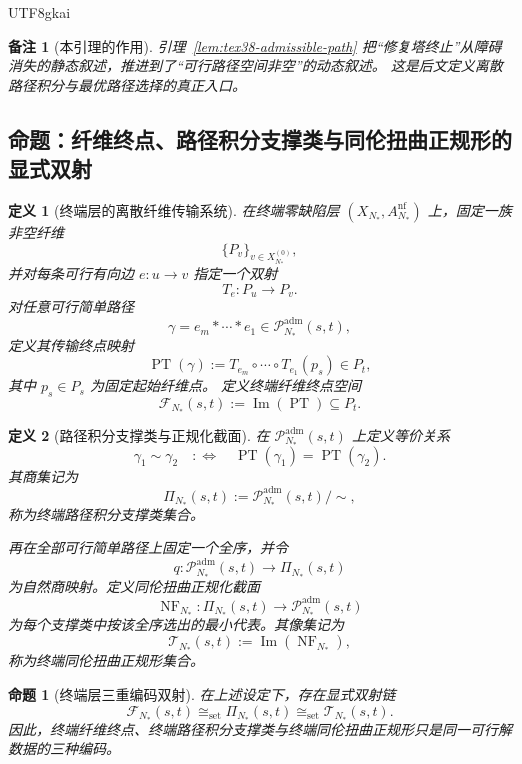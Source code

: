 \documentclass[12pt]{article}
\newtheorem{definition}{定义}[section]
\newtheorem{proposition}{命题}[section]
\newtheorem{remark}{备注}[section]
\newcommand{\NF}{\operatorname{NF}}
\newcommand{\PT}{\operatorname{PT}}
\begin{document}
\begin{CJK*}{UTF8}{gkai}
\begin{remark}[本引理的作用]
引理~\ref{lem:tex38-admissible-path} 把“修复塔终止”从障碍消失的静态叙述，推进到了“可行路径空间非空”的动态叙述。
这是后文定义离散路径积分与最优路径选择的真正入口。
\end{remark}

\subsection{命题：纤维终点、路径积分支撑类与同伦扭曲正规形的显式双射}
\label{sec:tex38-bijection}

\begin{definition}[终端层的离散纤维传输系统]
在终端零缺陷层 $(X_{N_\ast},A_{N_\ast}^{\mathrm{nf}})$ 上，固定一族非空纤维
\[
  \{P_v\}_{v\in X_{N_\ast}^{(0)}},
\]
并对每条可行有向边 $e:u\to v$ 指定一个双射
\[
  T_e:P_u\to P_v.
\]
对任意可行简单路径
\[
  \gamma=e_m*\cdots*e_1\in \mathcal{P}^{\mathrm{adm}}_{N_\ast}(s,t),
\]
定义其传输终点映射
\[
  \PT(\gamma):=T_{e_m}\circ\cdots\circ T_{e_1}(p_s)\in P_t,
\]
其中 $p_s\in P_s$ 为固定起始纤维点。
定义终端纤维终点空间
\[
  \mathcal{F}_{N_\ast}(s,t):=\operatorname{Im}(\PT)\subseteq P_t.
\]
\end{definition}

\begin{definition}[路径积分支撑类与正规化截面]
在 $\mathcal{P}^{\mathrm{adm}}_{N_\ast}(s,t)$ 上定义等价关系
\[
  \gamma_1\sim \gamma_2
  \quad:\Longleftrightarrow\quad
  \PT(\gamma_1)=\PT(\gamma_2).
\]
其商集记为
\[
  \Pi_{N_\ast}(s,t):=
  \mathcal{P}^{\mathrm{adm}}_{N_\ast}(s,t)\big/\sim,
\]
称为\emph{终端路径积分支撑类集合}。

再在全部可行简单路径上固定一个全序，并令
\[
  q:\mathcal{P}^{\mathrm{adm}}_{N_\ast}(s,t)\to \Pi_{N_\ast}(s,t)
\]
为自然商映射。定义\emph{同伦扭曲正规化截面}
\[
  \NF_{N_\ast}:\Pi_{N_\ast}(s,t)\to \mathcal{P}^{\mathrm{adm}}_{N_\ast}(s,t)
\]
为每个支撑类中按该全序选出的最小代表。其像集记为
\[
  \mathcal{T}_{N_\ast}(s,t):=\operatorname{Im}(\NF_{N_\ast}),
\]
称为\emph{终端同伦扭曲正规形集合}。
\end{definition}

\begin{proposition}[终端层三重编码双射]
\label{prop:tex38-bijection}
在上述设定下，存在显式双射链
\[
  \mathcal{F}_{N_\ast}(s,t)
  \cong_{\mathrm{set}}
  \Pi_{N_\ast}(s,t)
  \cong_{\mathrm{set}}
  \mathcal{T}_{N_\ast}(s,t).
\]
因此，终端纤维终点、终端路径积分支撑类与终端同伦扭曲正规形只是同一可行解数据的三种编码。
\end{proposition}


\end{CJK*}
\end{document}
